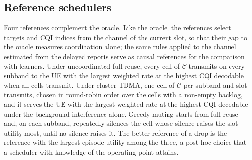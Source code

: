 \documentclass{ieeeaccess}
\begin{document}
\subsection{Reference schedulers}
Four references complement the oracle. Like the oracle, the references select targets and CQI indices from the channel of the current slot, so that their gap to the oracle measures coordination alone; the same rules applied to the channel estimated from the delayed reports serve as causal references for the comparison with learners. Under uncoordinated full reuse, every cell of $\mathcal{C}$ transmits on every subband to the UE with the largest weighted rate at the highest CQI decodable when all cells transmit. Under cluster TDMA, one cell of $\mathcal{C}$ per subband and slot transmits, chosen in round-robin order over the cells with a non-empty backlog, and it serves the UE with the largest weighted rate at the highest CQI decodable under the background interference alone. Greedy muting starts from full reuse and, on each subband, repeatedly silences the cell whose silence raises the slot utility most, until no silence raises it. The better reference of a drop is the reference with the largest episode utility among the three, a post hoc choice that a scheduler with knowledge of the operating point attains.
\end{document}
